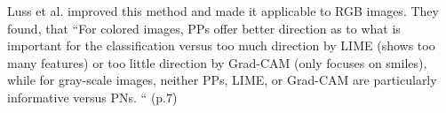 Luss et al. improved this method and made it applicable to RGB images.
They found, that “For colored images, PPs offer better direction as to what is important for the classification versus too much direction by LIME (shows too many features) or too little direction by Grad-CAM (only focuses on smiles), while for gray-scale images, neither PPs, LIME, or Grad-CAM are particularly informative versus PNs. “ (p.7)
